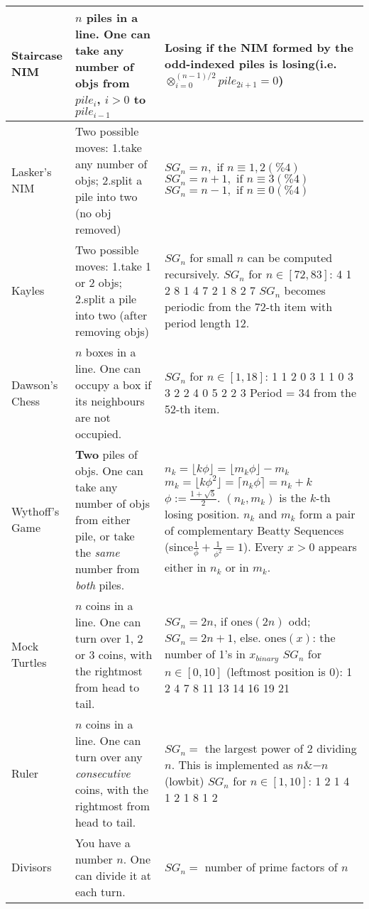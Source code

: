 \documentclass[landscape,a4paper,twocolumn,10pt]{report}
\begin{document}
\begin{xtabular}{p{1.5cm}|p{4cm}|p{7cm}}
Staircase NIM &
$n$ piles in a line. One can take any number of objs from $pile_i$, $i>0$ to $pile_{i-1}$ &
Losing if the NIM formed by the odd-indexed piles is losing(i.e. $\otimes_{i=0}^{(n-1)/2} pile_{2i+1}=0$)
\\ \hline

Lasker's NIM &
Two possible moves: 1.take any number of objs; 2.split a pile into two (no obj removed) &
$SG_n = n, \text{ if }n\equiv 1,2(\% 4)$ $SG_n = n+1, \text{ if }n\equiv3(\% 4)$ $SG_n = n-1, \text{ if }n\equiv0(\% 4)$
\\ \hline

Kayles &
Two possible moves: 1.take 1 or 2 objs; 2.split a pile into two (after removing objs) &
$SG_n$ for small $n$ can be computed recursively. $SG_n$ for $n \in [72,83]$: 4 1 2 8 1 4 7 2 1 8 2 7
$SG_n$ becomes periodic from the 72-th item with period length 12.
\\ \hline

Dawson's Chess &
$n$ boxes in a line. One can occupy a box if its neighbours are not occupied. &
$SG_n$ for $n\in [1,18]$: 1 1 2 0 3 1 1 0 3 3 2 2 4 0 5 2 2 3
Period = 34 from the 52-th item.
\\ \hline

Wythoff's Game
& \textbf{Two} piles of objs. One can take any number of objs from either pile, or take the \emph{same} number from \emph{both} piles. &
$n_k = \lfloor k \phi \rfloor = \lfloor m_k \phi \rfloor -m_k$  $m_k = \lfloor k \phi^2 \rfloor = \lceil n_k \phi \rceil = n_k + k$  $\phi:=\frac{1+\sqrt{5}}{2}$. $(n_k,m_k)$ is the $k$-th losing position.
$n_k$ and $m_k$ form a pair of complementary Beatty Sequences (since$\frac{1}{\phi}+\frac{1}{\phi^2}=1$). Every $x>0$ appears either in $n_k$ or in $m_k$.
\\ \hline

Mock Turtles &
$n$ coins in a line. One can turn over 1, 2 or 3 coins, with the rightmost from head to tail. &
$SG_n = 2n$, if $\mathrm{ones}(2n)$ odd; $SG_n = 2n + 1$, else. $\mathrm{ones}(x)$: the number of 1's in $x_{binary}$
$SG_n$ for $n\in [0,10]$ (leftmost position is 0): 1 2 4 7 8 11 13 14 16 19 21
\\ \hline

Ruler &
$n$ coins in a line. One can turn over any \emph{consecutive} coins, with the rightmost from head to tail. &
$SG_n=$ the largest power of 2 dividing $n$. This is implemented as $n$\&$-n$(lowbit)
$SG_n$ for $n\in [1,10]$: 1 2 1 4 1 2 1 8 1 2
\\ \hline

Divisors &
You have a number $n$. One can divide it at each turn. &
$SG_n=$ number of prime factors of $n$
\\ \hline


\end{xtabular}
\end{document}
